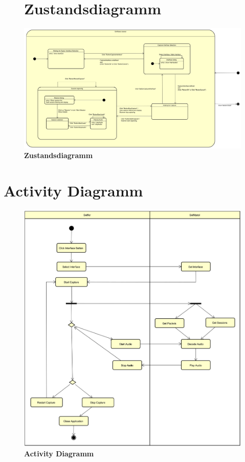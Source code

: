 \documentclass[a4,12pt]{scrartcl}
\begin{document}
\begin{landscape}
\begin{figure}[htbp]
\section{Zustandsdiagramm}
\centering
\includegraphics[width=\linewidth, height=\textheight,keepaspectratio]{./figures/Statemachine.png}
\caption{\textbf{Zustandsdiagramm}}
\end{figure}
\end{landscape}	

\section{Activity Diagramm}
\begin{figure} [H]
	\begin{center}
	\includegraphics[width=\textwidth]{./figures/ActivityDiagram.png}
	\caption{\textbf{Activity Diagramm}}
	\label{Bild Referenz}
	\end{center}
\end{figure}
\end{document}
